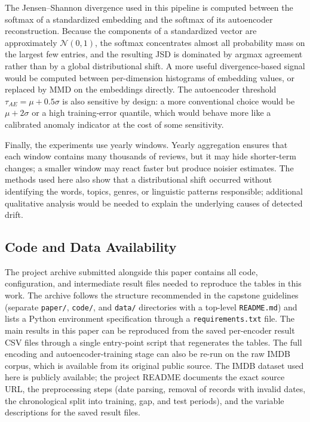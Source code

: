 \documentclass[conference]{IEEEtran}
\begin{document}
The Jensen--Shannon divergence used in this pipeline is computed between the softmax of a standardized embedding and the softmax of its autoencoder reconstruction. Because the components of a standardized vector are approximately $\mathcal{N}(0,1)$, the softmax concentrates almost all probability mass on the largest few entries, and the resulting JSD is dominated by argmax agreement rather than by a global distributional shift. A more useful divergence-based signal would be computed between per-dimension histograms of embedding values, or replaced by MMD on the embeddings directly. The autoencoder threshold $\tau_{AE} = \mu + 0.5\sigma$ is also sensitive by design: a more conventional choice would be $\mu + 2\sigma$ or a high training-error quantile, which would behave more like a calibrated anomaly indicator at the cost of some sensitivity.

Finally, the experiments use yearly windows. Yearly aggregation ensures that each window contains many thousands of reviews, but it may hide shorter-term changes; a smaller window may react faster but produce noisier estimates. The methods used here also show that a distributional shift occurred without identifying the words, topics, genres, or linguistic patterns responsible; additional qualitative analysis would be needed to explain the underlying causes of detected drift.

\subsection{Code and Data Availability}
\label{sec:reproducibility}

The project archive submitted alongside this paper contains all code, configuration, and intermediate result files needed to reproduce the tables in this work. The archive follows the structure recommended in the capstone guidelines (separate \texttt{paper/}, \texttt{code/}, and \texttt{data/} directories with a top-level \texttt{README.md}) and lists a Python environment specification through a \texttt{requirements.txt} file. The main results in this paper can be reproduced from the saved per-encoder result CSV files through a single entry-point script that regenerates the tables. The full encoding and autoencoder-training stage can also be re-run on the raw IMDB corpus, which is available from its original public source. The IMDB dataset used here is publicly available; the project README documents the exact source URL, the preprocessing steps (date parsing, removal of records with invalid dates, the chronological split into training, gap, and test periods), and the variable descriptions for the saved result files.
\end{document}
